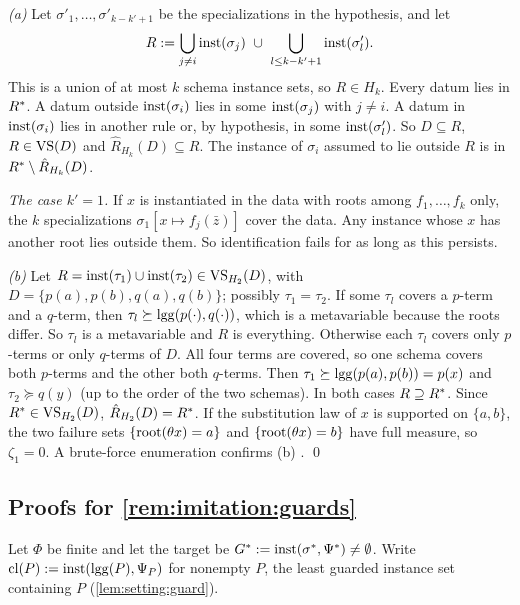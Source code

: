 \emph{(a)} Let $\sigma'_1,\dots,\sigma'_{k-k'+1}$ be the specializations in the hypothesis, and let
\[
R:=\bigcup_{j\neq i}\inst(\sigma_j)\ \cup\ \bigcup_{l\le k-k'+1}\inst(\sigma'_l).
\]
This is a union of at most $k$ schema instance sets, so $R\in H_k$. Every datum lies in $R^{*}$. A datum outside $\mathrm{inst}(\sigma_i)$ lies in some $\mathrm{inst}(\sigma_j)$ with $j\neq i$. A datum in $\mathrm{inst}(\sigma_i)$ lies in another rule or, by hypothesis, in some $\mathrm{inst}(\sigma'_l)$. So $D\subseteq R$, $R\in\mathrm{VS}(D)$ and $\hat R_{H_k}(D)\subseteq R$. The instance of $\sigma_i$ assumed to lie outside $R$ is in $R^{*}\setminus\hat R_{H_k}(D)$.

\emph{The case $k'=1$.} If $x$ is instantiated in the data with roots among $f_1,\dots,f_k$ only, the $k$ specializations $\sigma_1[x\mapsto f_j(\bar z)]$ cover the data. Any instance whose $x$ has another root lies outside them. So identification fails for as long as this persists.

\emph{(b)} Let $R=\mathrm{inst}(\tau_1)\cup\mathrm{inst}(\tau_2)\in\mathrm{VS}_{H_2}(D)$, with $D=\{p(a),p(b),q(a),q(b)\}$; possibly $\tau_1=\tau_2$. If some $\tau_l$ covers a $p$-term and a $q$-term, then $\tau_l\succeq\mathrm{lgg}(p(\cdot),q(\cdot))$, which is a metavariable because the roots differ. So $\tau_l$ is a metavariable and $R$ is everything. Otherwise each $\tau_l$ covers only $p$-terms or only $q$-terms of $D$. All four terms are covered, so one schema covers both $p$-terms and the other both $q$-terms. Then $\tau_1\succeq\mathrm{lgg}(p(a),p(b))=p(x)$ and $\tau_2\succeq q(y)$ (up to the order of the two schemas). In both cases $R\supseteq R^{*}$. Since $R^{*}\in\mathrm{VS}_{H_2}(D)$, $\hat R_{H_2}(D)=R^{*}$. If the substitution law of $x$ is supported on $\{a,b\}$, the two failure sets $\{\mathrm{root}(\theta x)=a\}$ and $\{\mathrm{root}(\theta x)=b\}$ have full measure, so $\zeta_1=0$. A brute-force enumeration confirms (b) . \qed

\subsection{Proofs for \texorpdfstring{\cref{rem:imitation:guards}}{the remark on side conditions}}\label{app:imitation:guards}

Let $\Phi$ be finite and let the target be $G^*:=\mathrm{inst}(\sigma^*,\Psi^*)\neq\emptyset$. Write $\mathrm{cl}(P):=\mathrm{inst}(\mathrm{lgg}(P),\Psi_P)$ for nonempty $P$, the least guarded instance set containing $P$ (\cref{lem:setting:guard}).

